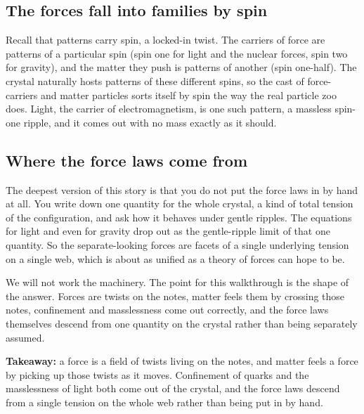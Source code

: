 \subsection{The forces fall into families by spin}

Recall that patterns carry spin, a locked-in twist. The carriers of force are patterns of a particular spin (spin one for light and the nuclear forces, spin two for gravity), and the matter they push is patterns of another (spin one-half). The crystal naturally hosts patterns of these different spins, so the cast of force-carriers and matter particles sorts itself by spin the way the real particle zoo does. Light, the carrier of electromagnetism, is one such pattern, a massless spin-one ripple, and it comes out with no mass exactly as it should.

\subsection{Where the force laws come from}

The deepest version of this story is that you do not put the force laws in by hand at all. You write down one quantity for the whole crystal, a kind of total tension of the configuration, and ask how it behaves under gentle ripples. The equations for light and even for gravity drop out as the gentle-ripple limit of that one quantity. So the separate-looking forces are facets of a single underlying tension on a single web, which is about as unified as a theory of forces can hope to be.

We will not work the machinery. The point for this walkthrough is the shape of the answer. Forces are twists on the notes, matter feels them by crossing those notes, confinement and masslessness come out correctly, and the force laws themselves descend from one quantity on the crystal rather than being separately assumed.

\textbf{Takeaway:} a force is a field of twists living on the notes, and matter feels a force by picking up those twists as it moves. Confinement of quarks and the masslessness of light both come out of the crystal, and the force laws descend from a single tension on the whole web rather than being put in by hand.
